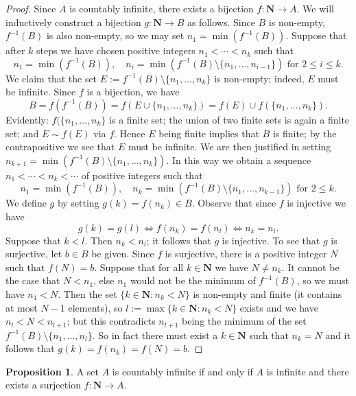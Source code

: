 \documentclass[12pt]{article}
\theoremstyle{definition}
\newtheorem{proposition}[definition]{Proposition}
\newcommand{\N}{\mathbf{N}}
\begin{document}
\begin{proof}
    Since \( A \) is countably infinite, there exists a bijection \( f : \N \to A \). We will inductively construct a bijection \( g : \N \to B \) as follows. Since \( B \) is non-empty, \( f^{-1}(B) \) is also non-empty, so we may set \( n_1 = \min( f^{-1}(B)) \). Suppose that after \( k \) steps we have chosen positive integers \( n_1 < \cdots < n_k \) such that
    \[
        n_1 = \min(f^{-1}(B)), \quad n_i = \min(f^{-1}(B) \setminus \{ n_1, \ldots, n_{i-1} \}) \text{ for } 2 \leq i \leq k.
    \]
    We claim that the set \( E := f^{-1}(B) \setminus \{ n_1, \ldots, n_k \} \) is non-empty; indeed, \( E \) must be infinite. Since \( f \) is a bijection, we have
    \[
        B = f(f^{-1}(B)) = f(E \cup \{ n_1, \ldots, n_k \}) = f(E) \cup f(\{n_1, \ldots, n_k\}).
    \]
    Evidently: \( f(\{n_1, \ldots, n_k\} \) is a finite set; the union of two finite sets is again a finite set; and \( E \sim f(E) \) via \( f \). Hence \( E \) being finite implies that \( B \) is finite; by the contrapositive we see that \( E \) must be infinite. We are then justified in setting \( n_{k+1} = \min( f^{-1}(B) \setminus \{ n_1, \ldots, n_k \} ) \). In this way we obtain a sequence \( n_1 < \cdots < n_k < \cdots \) of positive integers such that
    \[
        n_1 = \min(f^{-1}(B)), \quad n_k = \min(f^{-1}(B) \setminus \{ n_1, \ldots, n_{k-1} \}) \text{ for } 2 \leq k.
    \]
    We define \( g \) by setting \( g(k) = f(n_k) \in B \). Observe that since \( f \) is injective we have
    \[
        g(k) = g(l) \iff f(n_k) = f(n_l) \iff n_k = n_l.
    \]
    Suppose that \( k < l \). Then \( n_k < n_l \); it follows that \( g \) is injective. To see that \( g \) is surjective, let \( b \in B \) be given. Since \( f \) is surjective, there is a positive integer \( N \) such that \( f(N) = b \). Suppose that for all \( k \in \N \) we have \( N \neq n_k \). It cannot be the case that \( N < n_1 \), else \( n_1 \) would not be the minimum of \( f^{-1}(B) \), so we must have \( n_1 < N \). Then the set \( \{ k \in \N : n_k < N \} \) is non-empty and finite (it contains at most \( N - 1 \) elements), so \( l := \max \{ k \in \N : n_k < N \} \) exists and we have \( n_l < N < n_{l+1} \); but this contradicts \( n_{l+1} \) being the minimum of the set \( f^{-1}(B) \setminus \{ n_1, \ldots, n_l \} \). So in fact there must exist a \( k \in \N \) such that \( n_k = N \) and it follows that \( g(k) = f(n_k) = f(N) = b \).
\end{proof}

\begin{proposition}
\label{prop:countable_iff_surjection_from_N}
    A set \( A \) is countably infinite if and only if \( A \) is infinite and there exists a surjection \( f : \N \to A \).
\end{proposition}
\end{document}

